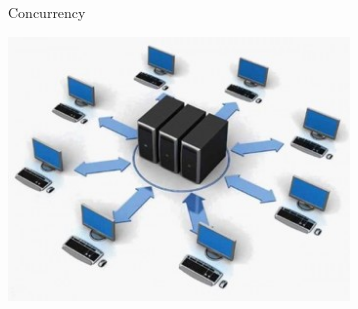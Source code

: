 \begin{frame}[fragile]{Concurrency}
  \begin{center}
    \includegraphics[height=7cm,keepaspectratio]{sources/images/socket-api-3-350x271.jpg}
  \end{center}
\end{frame}


